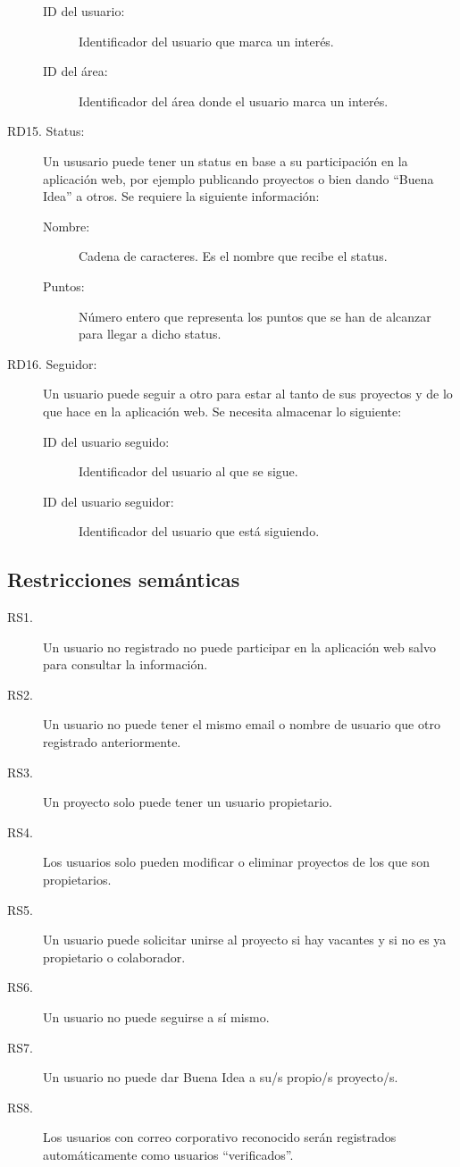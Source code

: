 \begin{description}
\begin{description}
            \item[ID del usuario:] Identificador del usuario que marca un interés.
            \item[ID del área:] Identificador del área donde el usuario marca un interés.
        \end{description}
    \item[RD15. Status:] Un ususario puede tener un status en base a su participación en la aplicación web, por ejemplo publicando proyectos o bien dando ``Buena Idea'' a otros. Se requiere la siguiente información:
        \begin{description}
            \item[Nombre:] Cadena de caracteres. Es el nombre que recibe el status.
            \item[Puntos:] Número entero que representa los puntos que se han de alcanzar para llegar a dicho status.
        \end{description}
    \item[RD16. Seguidor:] Un usuario puede seguir a otro para estar al tanto de sus proyectos y de lo que hace en la aplicación web. Se necesita almacenar lo siguiente:
        \begin{description}
            \item[ID del usuario seguido:] Identificador del usuario al que se sigue.
            \item[ID del usuario seguidor:] Identificador del usuario que está siguiendo.
        \end{description}
\end{description}

\subsection*{Restricciones semánticas}
\begin{description}
    \item[RS1.] Un usuario no registrado no puede participar en la aplicación web salvo para consultar la información.
    \item[RS2.] Un usuario no puede tener el mismo email o nombre de usuario que otro registrado anteriormente.
    \item[RS3.] Un proyecto solo puede tener un usuario propietario.
    \item[RS4.] Los usuarios solo pueden modificar o eliminar proyectos de los que son propietarios.
    \item[RS5.] Un usuario puede solicitar unirse al proyecto si hay vacantes y si no es ya propietario o colaborador.
    \item[RS6.] Un usuario no puede seguirse a sí mismo.
    \item[RS7.] Un usuario no puede dar Buena Idea a su/s propio/s proyecto/s.
    \item[RS8.] Los usuarios con correo corporativo reconocido serán registrados automáticamente como usuarios ``verificados''.
\end{description}

